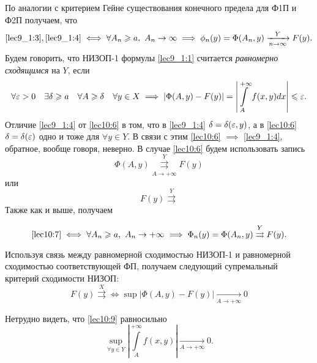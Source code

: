\documentclass[../../main.tex]{subfiles}
\begin{document}
По аналогии с критерием Гейне существования конечного предела для Ф1П и Ф2П 
получаем, что 
\[\eqref{lec9_1:3}, \eqref{lec9_1:4} \iff \forall A_n \ge 
a,\ A_n \to \infty \implies \phi_n(y) =\Phi(A_n,y) \xrightarrow[n\rightarrow 
\infty]{Y}F(y).\]
Будем говорить, что НИЗОП-1 формулы \eqref{lec9_1:1}  считается 
\emph{равномерно сходящимся} на $Y$, если
\begin{equation}
\label{lec10:6}
\forall \eps > 0\quad \exists \delta \ge a\quad \forall A \ge \delta\quad 
\forall y\in X 
\implies \left| \Phi(A,y) - F(y) \right| = \left| \int\limits_A^{+\infty} 
f(x,y) dx \right| \le \eps.
\end{equation}
Отличие \eqref{lec9_1:4} от \eqref{lec10:6} в том, что в \eqref{lec9_1:4} 
$\delta = 
\delta(\eps,y)$, а в \eqref{lec10:6} $\delta = \delta(\eps)$ одно и тоже для
$\forall y \in Y$. В связи с этим \eqref{lec10:6} $\implies$ \eqref{lec9_1:4}, 
обратное, вообще говоря, неверно. 
В случае \eqref{lec10:6} будем использовать запись \begin{equation}
\label{lec10:7}
\Phi(A,y)\overset{Y}{\underset{A \to +\infty}{\rightrightarrows}}F(y)
\end{equation}
или 
\begin{equation}
F(y)\overset{Y}{\rightrightarrows}
\end{equation}
Также как и выше, получаем 

\begin{thm}
\begin{equation}
\label{lec10:8}
 \eqref{lec10:7} \iff \forall A_n \ge a,\ A_n\rightarrow +\infty \implies 
 \Phi_n(y) = \Phi(A_n,y) \overset{Y}\rightrightarrows F(y).
\end{equation}
\end{thm}
Используя связь между равномерной сходимостью НИЗОП-1 и равномерной 
сходимостью соответствующей ФП, получаем следующий супремальный критерий 
сходимости НИЗОП:
\begin{equation}
\label{lec10:9}
F(y)\overset{X} \rightrightarrows \iff \sup\left|\Phi(A , y) - F(y) \right| 
\underset{A \to + \infty}\to 0 \end{equation}

Нетрудно видеть, что \eqref{lec10:9} равносильно
\begin{equation}
\label{lec10:10} \underset{\forall y \in 
Y}\sup\left|\int\limits_A^{+\infty} f(x,y)\right| \underset{A \to + \infty} 
\to 0. \end{equation}
\end{document}

